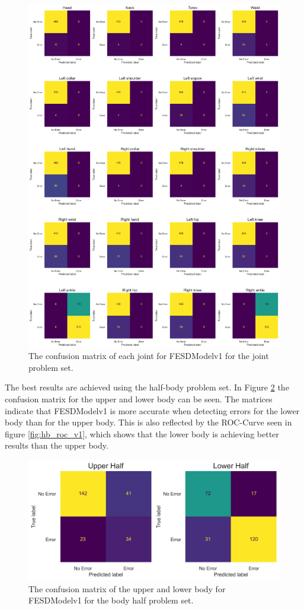 \begin{figure}[!htbp]
  \centering
  \includegraphics[width=.8\linewidth]{figures/Results/v1/confusion/joints_joint.png}
  \caption[Confusion matrix of FESDModelv1 for each Joint]{The confusion matrix of each joint for FESDModelv1 for the joint problem set.}
  \label{fig:conf_v1_jts}
\end{figure}

The best results are achieved using the half-body problem set. In Figure \ref{fig:conf_v1_hbs} the confusion matrix for the upper and lower body can be seen. The matrices indicate that FESDModelv1 is more accurate when detecting errors for the lower body than for the upper body. This is also reflected by the ROC-Curve seen in figure \ref{fig:hb_roc_v1}, which shows that the lower body is achieving better results than the upper body.

\begin{figure}[!htbp]
  \centering
  \includegraphics[width=.8\linewidth]{figures/Results/v1/confusion/body_halves_half.png}
  \caption[Confusion matrix of FESDModelv1 for each Body Half]{The confusion matrix of the upper and lower body for FESDModelv1 for the body half problem set.}
  \label{fig:conf_v1_hbs}
\end{figure}

\FloatBarrier